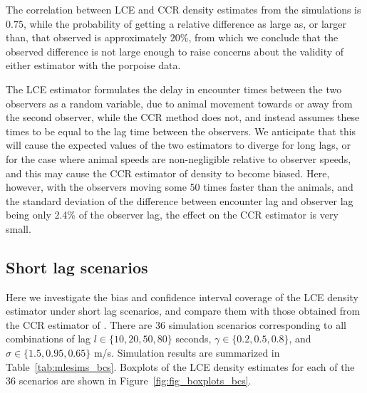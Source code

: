 \documentclass[useAMS, usenatbib, referee]{biom}\usepackage[]{graphicx}\usepackage[]{color}
\begin{document}
The correlation between LCE and CCR density estimates from the simulations is $0.75$, while the probability of getting a relative difference as large as, or larger than, that observed is approximately $20$\%, from which we conclude that the observed difference is not large enough to raise concerns about the validity of either estimator with the porpoise data.




The LCE estimator formulates the delay in encounter times between the two observers as a random variable, due to animal movement towards or away from the second observer, while the CCR method does not, and instead assumes these times to be equal to the lag time between the observers. We anticipate that this will cause the expected values of the two estimators to diverge for long lags, or for the case where animal speeds are non-negligible relative to observer speeds, and this may cause the CCR estimator of density to become biased. Here, however, with the observers moving some 50 times faster than the animals, and the standard deviation of the difference between encounter lag and observer lag being only 2.4\% of the observer lag, the effect on the CCR estimator is very small.

\subsection{Short lag scenarios}


Here we investigate the bias and confidence interval coverage of the LCE density estimator under short lag scenarios, and compare them with those obtained from the CCR estimator of \cite{Stevenson+al:18}. There are 36 simulation scenarios corresponding to all combinations of lag $l \in \{ 10, 20, 50, 80\}$ seconds,  $\gamma \in\{ 0.2, 0.5, 0.8\}$, and $\sigma\in\{ 1.5, 0.95, 0.65\}$ m/s. Simulation results are summarized in Table~\ref{tab:mlesims_bcs}. Boxplots of the LCE density estimates for each of the 36 scenarios are shown in Figure~\ref{fig:fig_boxplots_bcs}.
\end{document}
